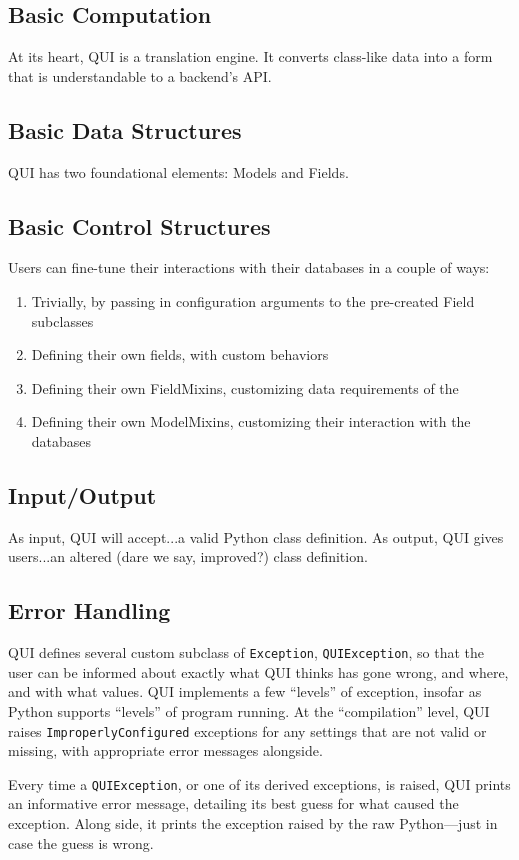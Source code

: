 \documentclass{article} %
\newcommand{\il}[1]{\lstinline{#1}}
\begin{document}
\subsection{Basic Computation}
At its heart, QUI is a translation engine. It converts class-like data into a form that is understandable to a backend's API.
\subsection{Basic Data Structures}
QUI has two foundational elements: Models and Fields. 
\subsection{Basic Control Structures}
Users can fine-tune their interactions with their databases in a couple of ways:
\begin{enumerate}
\item Trivially, by passing in configuration arguments to the pre-created Field subclasses
\item Defining their own fields, with custom behaviors
\item Defining their own FieldMixins, customizing data requirements of the 
\item Defining their own ModelMixins, customizing their interaction with the databases
\end{enumerate}

\subsection{Input/Output}
As input, QUI will accept...a valid Python class definition. As output, QUI gives users...an altered (dare we say, improved?) class definition.


\subsection{Error Handling}
QUI defines several custom subclass of \il{Exception}, \il{QUIException}, so that the
user can be informed about exactly what QUI thinks has gone wrong, and where, and with what values.
QUI implements a few ``levels'' of exception, insofar as Python supports ``levels'' of program running. At the ``compilation'' level, QUI
raises \il{ImproperlyConfigured} exceptions for any settings that are not valid or missing, with appropriate error messages alongside.

Every time a \il{QUIException}, or one of its derived exceptions, is raised, QUI prints an informative error message, detailing its best
guess for what caused the exception. Along side, it prints the exception raised by the raw Python---just in case the guess is wrong.
\end{document}
